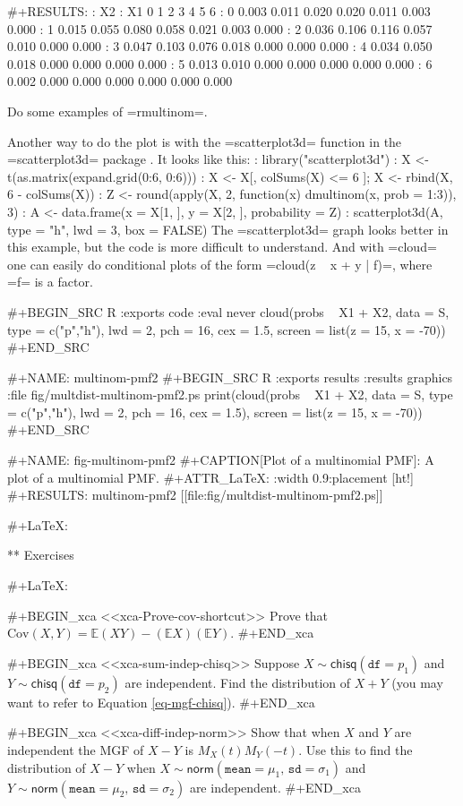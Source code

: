 #+RESULTS:
:    X2
: X1      0     1     2     3     4     5     6
:   0 0.003 0.011 0.020 0.020 0.011 0.003 0.000
:   1 0.015 0.055 0.080 0.058 0.021 0.003 0.000
:   2 0.036 0.106 0.116 0.057 0.010 0.000 0.000
:   3 0.047 0.103 0.076 0.018 0.000 0.000 0.000
:   4 0.034 0.050 0.018 0.000 0.000 0.000 0.000
:   5 0.013 0.010 0.000 0.000 0.000 0.000 0.000
:   6 0.002 0.000 0.000 0.000 0.000 0.000 0.000

Do some examples of =rmultinom=.

Another way to do the plot is with the =scatterplot3d= function in the
=scatterplot3d= package \cite{scatterplot3d}. It looks like this:
: library("scatterplot3d")
: X <- t(as.matrix(expand.grid(0:6, 0:6)))
: X <- X[, colSums(X) <= 6 ]; X <- rbind(X, 6 - colSums(X))
: Z <- round(apply(X, 2, function(x) dmultinom(x, prob = 1:3)), 3)
: A <- data.frame(x = X[1, ], y = X[2, ], probability = Z)
: scatterplot3d(A, type = "h", lwd = 3, box = FALSE)
The =scatterplot3d= graph looks better in this example, but the code
is more difficult to understand. And with =cloud= one can easily do
conditional plots of the form =cloud(z ~ x + y | f)=, where =f= is a
factor.

#+BEGIN_SRC R :exports code :eval never 
cloud(probs ~ X1 + X2, data = S, type = c("p","h"), lwd = 2, 
            pch = 16, cex = 1.5, screen = list(z = 15, x = -70))
#+END_SRC

#+NAME: multinom-pmf2
#+BEGIN_SRC R :exports results :results graphics :file fig/multdist-multinom-pmf2.ps
print(cloud(probs ~ X1 + X2, data = S, type = c("p","h"), lwd = 2, 
            pch = 16, cex = 1.5), screen = list(z = 15, x = -70))
#+END_SRC

#+NAME: fig-multinom-pmf2
#+CAPTION[Plot of a multinomial PMF]: \small A plot of a multinomial PMF.
#+ATTR_LaTeX: :width 0.9\textwidth :placement [ht!]
#+RESULTS: multinom-pmf2
[[file:fig/multdist-multinom-pmf2.ps]]

#+LaTeX: \newpage{}

** Exercises

#+LaTeX: \setcounter{thm}{0}

#+BEGIN_xca
<<xca-Prove-cov-shortcut>> Prove that \(
\mbox{Cov}(X,Y)=\mathbb{E}(XY)-(\mathbb{E} X)(\mathbb{E} Y). \)
#+END_xca

#+BEGIN_xca
<<xca-sum-indep-chisq>> Suppose
\(X\sim\mathsf{chisq}(\mathtt{df}=p_{1})\) and
\(Y\sim\mathsf{chisq}(\mathtt{df}=p_{2})\) are independent. Find the
distribution of \(X+Y\) (you may want to refer to Equation
\eqref{eq-mgf-chisq}).
#+END_xca

#+BEGIN_xca
<<xca-diff-indep-norm>> Show that when \(X\) and \(Y\) are independent
the MGF of \(X-Y\) is \(M_{X}(t)M_{Y}(-t)\). Use this to find the
distribution of \(X-Y\) when
\(X\sim\mathsf{norm}(\mathtt{mean}=\mu_{1},\,\mathtt{sd}=\sigma_{1})\)
and
\(Y\sim\mathsf{norm}(\mathtt{mean}=\mu_{2},\,\mathtt{sd}=\sigma_{2})\)
are independent.
#+END_xca
